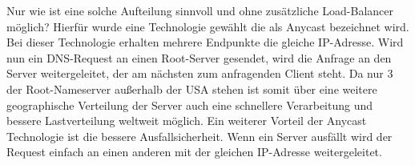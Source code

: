Nur wie ist eine solche Aufteilung sinnvoll und ohne zusätzliche Load-Balancer möglich? Hierfür wurde eine Technologie gewählt die als Anycast bezeichnet wird. Bei dieser Technologie erhalten mehrere Endpunkte die gleiche IP-Adresse. Wird nun ein DNS-Request an einen Root-Server gesendet, wird die Anfrage an den Server weitergeleitet, der am nächsten zum anfragenden Client steht. Da nur 3 der Root-Nameserver außerhalb der USA stehen ist somit über eine weitere geographische Verteilung der Server auch eine schnellere Verarbeitung und bessere Lastverteilung weltweit möglich. Ein weiterer Vorteil der Anycast Technologie ist die bessere Ausfallsicherheit. Wenn ein Server ausfällt wird der Request einfach an einen anderen mit der gleichen IP-Adresse weitergeleitet. \cite{1&1InternetSE.2018}
